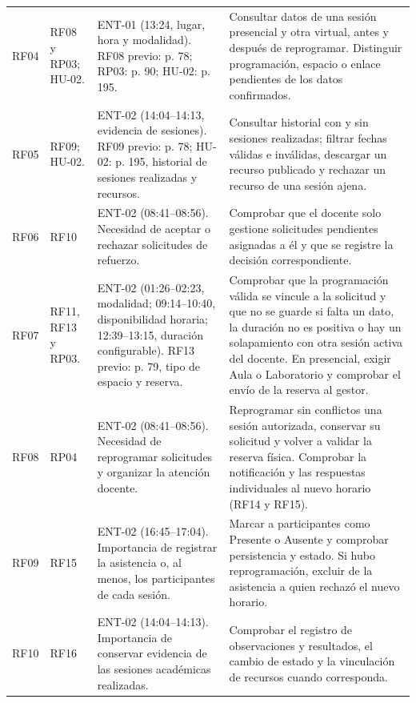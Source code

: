 \begin{longtable}{@{}p{}p{}p{}p{}@{}}
RF04 &
RF08 y RP03; HU-02. &
ENT-01 (13:24, lugar, hora y modalidad).
RF08 previo: p. 78; RP03: p. 90;
HU-02: p. 195. &
Consultar datos de una sesión presencial y otra virtual,
antes y después de reprogramar. Distinguir programación,
espacio o enlace pendientes de los datos confirmados. \\

RF05 &
RF09; HU-02. &
ENT-02 (14:04--14:13, evidencia de sesiones).
RF09 previo: p. 78; HU-02: p. 195,
historial de sesiones realizadas y recursos. &
Consultar historial con y sin sesiones realizadas;
filtrar fechas válidas e inválidas, descargar un recurso
publicado y rechazar un recurso de una sesión ajena. \\

RF06 &
RF10 &
ENT-02 (08:41--08:56).
Necesidad de aceptar o rechazar solicitudes
de refuerzo. &
Comprobar que el docente solo gestione solicitudes
pendientes asignadas a él y que se registre
la decisión correspondiente. \\

RF07 &
RF11, RF13 y RP03. &
ENT-02 (01:26--02:23, modalidad;
09:14--10:40, disponibilidad horaria;
12:39--13:15, duración configurable).
RF13 previo: p. 79, tipo de espacio y reserva. &
Comprobar que la programación válida se vincule
a la solicitud y que no se guarde si falta un dato,
la duración no es positiva o hay un solapamiento
con otra sesión activa del docente. En presencial, exigir
Aula o Laboratorio y comprobar el envío de la reserva al gestor. \\

RF08 &
RP04 &
ENT-02 (08:41--08:56).
Necesidad de reprogramar solicitudes
y organizar la atención docente. &
Reprogramar sin conflictos una sesión autorizada,
conservar su solicitud y volver a validar la reserva física.
Comprobar la notificación y las respuestas individuales
al nuevo horario (RF14 y RF15). \\

RF09 &
RF15 &
ENT-02 (16:45--17:04).
Importancia de registrar la asistencia o, al menos,
los participantes de cada sesión. &
Marcar a participantes como Presente o Ausente y
comprobar persistencia y estado. Si hubo reprogramación,
excluir de la asistencia a quien rechazó el nuevo horario. \\

RF10 &
RF16 &
ENT-02 (14:04--14:13).
Importancia de conservar evidencia
de las sesiones académicas realizadas. &
Comprobar el registro de observaciones y resultados,
el cambio de estado y la vinculación
de recursos cuando corresponda. \\


\end{longtable}
